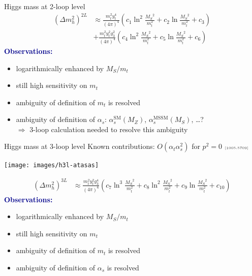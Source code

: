 \documentclass[hyperref={pdfpagelabels=false},ngerman]{beamer}
\newcommand{\cmark}{\ding{51}}%
\newcommand{\ok}{\textcolor{darkgreen}{\cmark}}
\newcommand{\MS}{\ensuremath{M_S}}
\newcommand{\mycite}[1]{\ensuremath{\text{\textcolor{darkgray}{\tiny [#1]}}}}
\renewcommand{\emph}[1]{\textbf{\textcolor{darkblue}{#1}}}
\newcommand{\SM}{\ensuremath{\text{SM}}}
\newcommand{\MSSM}{\ensuremath{\text{MSSM}}}
\newcommand{\at}{\alpha_t}
\newcommand{\as}{\alpha_s}
\begin{document}
\begin{frame}{Higgs mass at 2-loop level}
  \begin{align*}
    (\Delta m_h^2)^{2L} &\approx
    \frac{m_t^2 y_t^4}{(4\pi)^4} \left(
      c_1 \ln^2\frac{\MS^2}{m_t^2}
      + c_2 \ln\frac{\MS^2}{m_t^2}
      + c_3
    \right) \\
    & +
    \frac{m_t^2 y_t^2 g_3^2}{(4\pi)^4} \left(
      c_4 \ln^2\frac{\MS^2}{m_t^2}
      + c_5 \ln\frac{\MS^2}{m_t^2}
      + c_6
    \right)
  \end{align*}
  \emph{Observations:}
  \begin{itemize}
  \item logarithmically enhanced by $\MS / m_t$
  \item still high sensitivity on $m_t$
  \item ambiguity of definition of $m_t$ is resolved \ok
  \item ambiguity of definition of $\as$: $\as^\SM(M_Z)$, $\as^\MSSM(\MS)$, \ldots ? \\
    $\Rightarrow$ 3-loop calculation needed to resolve this ambiguity
  \end{itemize}
\end{frame}

\begin{frame}{Higgs mass at 3-loop level}
  Known contributions: $O(\at\as^2)$ for $p^2 = 0$ \mycite{1005.5709}
  \begin{center}
    \texttt{[image: images/h3l-atasas]}
  \end{center}
  \begin{align*}
    (\Delta m_h^2)^{3L} &\approx
    \frac{m_t^2 y_t^2 g_3^4}{(4\pi)^6} \left(
      c_7 \ln^3\frac{\MS^2}{m_t^2}
      + c_8 \ln^2\frac{\MS^2}{m_t^2}
      + c_9 \ln\frac{\MS^2}{m_t^2}
      + c_{10}
    \right)
  \end{align*}
  \emph{Observations:}
  \begin{itemize}
  \item logarithmically enhanced by $\MS / m_t$
  \item still high sensitivity on $m_t$
  \item ambiguity of definition of $m_t$ is resolved \ok
  \item ambiguity of definition of $\as$ is resolved \ok
  \end{itemize}
\end{frame}
\end{document}
